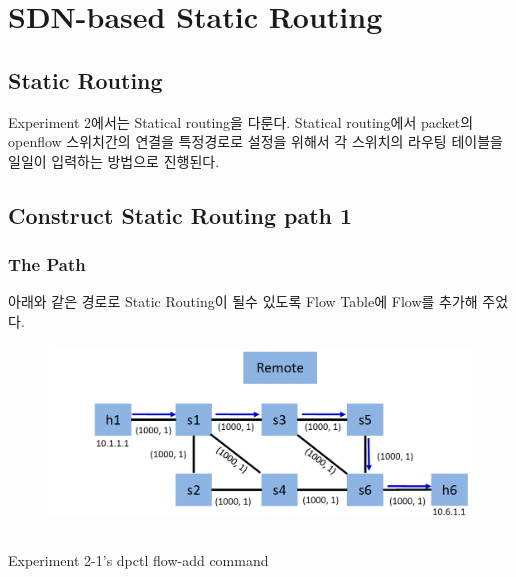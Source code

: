 \section{SDN-based Static Routing}
\vspace{-2mm}
\subsection*{Static Routing}
Experiment 2에서는 Statical routing을 다룬다. Statical routing에서 packet의 openflow 스위치간의 연결을 
특정경로로 설정을 위해서  각 스위치의 라우팅 테이블을 일일이 입력하는 방법으로 진행된다.
\vspace{-4mm}
\subsection{Construct Static Routing path 1}
\subsubsection*{The Path}
아래와 같은 경로로 Static Routing이 될수 있도록 Flow Table에 Flow를 추가해 주었다.\\
    \vspace{-4mm}
\begin{figure}[!h]\centering 
	\includegraphics[width=.65\textwidth]{image/week08/2-1-0.png}
	\vspace{-10pt}
\end{figure}
\begin{listing}[h!]
\inputminted[framerule = 1pt,framesep = 2mm , frame = lines, fontsize=\footnotesize]{python}{./code/week08/flow2-1.sh}
\vspace{-5mm}
\caption{\footnotesize Experiment 2-1’s dpctl flow-add command}
\end{listing}
    \vspace{-12mm}
